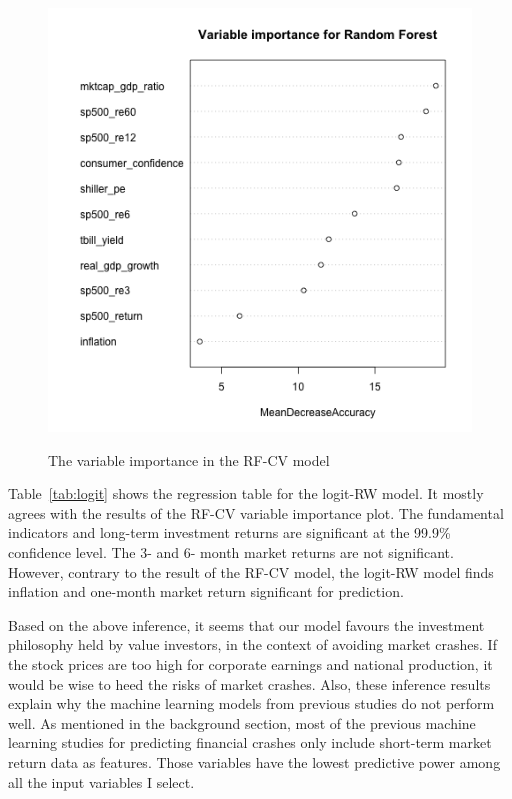 \documentclass[12pt, man, a4paper, floatsintext]{apa7}
\begin{document}
\begin{figure}
    \centering
    \caption{The variable importance in the RF-CV model}
    \includegraphics[width=15cm]{varImp.png}
    \label{fig:varImp}
\end{figure}

Table~\ref{tab:logit} shows the regression table for the logit-RW model. It mostly agrees with the results of the RF-CV variable importance plot. The fundamental indicators and long-term investment returns are significant at the 99.9\% confidence level. The 3- and 6- month market returns are not significant. However, contrary to the result of the RF-CV model, the logit-RW model finds inflation and one-month market return significant for prediction.



Based on the above inference, it seems that our model favours the investment philosophy held by value investors, in the context of avoiding market crashes. If the stock prices are too high for corporate earnings and national production, it would be wise to heed the risks of market crashes. Also, these inference results explain why the machine learning models from previous studies do not perform well. As mentioned in the background section, most of the previous machine learning studies for predicting financial crashes only include short-term market return data as features. Those variables have the lowest predictive power among all the input variables I select.
\end{document}
